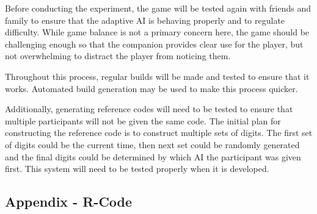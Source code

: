 \documentclass{IEEEtran}
\begin{document}
Before conducting the experiment, the game will be tested again with friends and family to ensure that the adaptive AI is behaving properly and to regulate difficulty. While game balance is not a primary concern here, the game should be challenging enough so that the companion provides clear use for the player, but not overwhelming to distract the player from noticing them.

Throughout this process, regular builds will be made and tested to ensure that it works. Automated build generation may be used to make this process quicker.

Additionally, generating reference codes will need to be tested to ensure that multiple participants will not be given the same code. The initial plan for constructing the reference code is to construct multiple sets of digits. The first set of digits could be the current time, then next set could be randomly generated and the final digits could be determined by which AI the participant was given first. This system will need to be tested properly when it is developed.


\onecolumn
\subsection{Appendix - R-Code}
\label{AppendixRCode}
\end{document}
